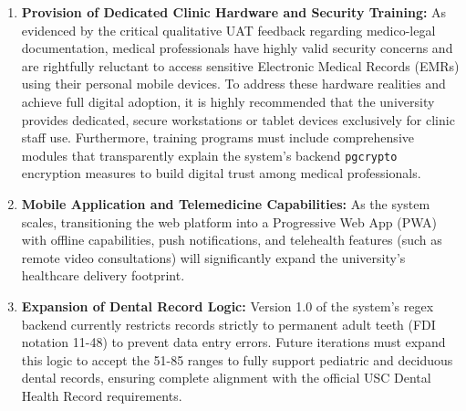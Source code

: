 \begin{enumerate}
    \item \textbf{Provision of Dedicated Clinic Hardware and Security Training:} As evidenced by the critical qualitative UAT feedback regarding medico-legal documentation, medical professionals have highly valid security concerns and are rightfully reluctant to access sensitive Electronic Medical Records (EMRs) using their personal mobile devices. To address these hardware realities and achieve full digital adoption, it is highly recommended that the university provides dedicated, secure workstations or tablet devices exclusively for clinic staff use. Furthermore, training programs must include comprehensive modules that transparently explain the system’s backend \texttt{pgcrypto} encryption measures to build digital trust among medical professionals.
    \item \textbf{Mobile Application and Telemedicine Capabilities:} As the system scales, transitioning the web platform into a Progressive Web App (PWA) with offline capabilities, push notifications, and telehealth features (such as remote video consultations) will significantly expand the university's healthcare delivery footprint.
    \item \textbf{Expansion of Dental Record Logic:} Version 1.0 of the system’s regex backend currently restricts records strictly to permanent adult teeth (FDI notation 11-48) to prevent data entry errors. Future iterations must expand this logic to accept the 51-85 ranges to fully support pediatric and deciduous dental records, ensuring complete alignment with the official USC Dental Health Record requirements.
\end{enumerate}